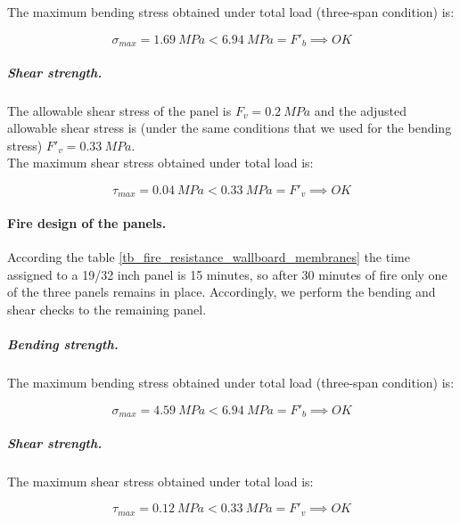 The maximum bending stress obtained under total load (three-span condition) is:

\begin{equation}
  \sigma_{max}= 1.69\ MPa < 6.94\ MPa = F'_b \implies OK
\end{equation}


\subparagraph{Shear strength.}
The allowable shear stress of the panel is $F_v= 0.2\ MPa$ and the adjusted allowable shear stress is (under the same conditions that we used for the bending stress) $F'_v= 0.33\ MPa$.\\

The maximum shear stress obtained under total load is:

\begin{equation}
  \tau_{max}= 0.04\ MPa < 0.33\ MPa = F'_v \implies OK
\end{equation}

\paragraph{Fire design of the panels.}
According the table \ref{tb_fire_resistance_wallboard_membranes} the time assigned to a 19/32 inch panel is 15 minutes, so after 30 minutes of fire only one of the three panels remains in place. Accordingly, we perform the bending and shear checks to the remaining panel.

\subparagraph{Bending strength.}
The maximum bending stress obtained under total load (three-span condition) is:

\begin{equation}
  \sigma_{max}= 4.59\ MPa < 6.94\ MPa = F'_b \implies OK
\end{equation}


\subparagraph{Shear strength.}
The maximum shear stress obtained under total load is:

\begin{equation}
  \tau_{max}= 0.12\ MPa < 0.33\ MPa = F'_v \implies OK
\end{equation}


